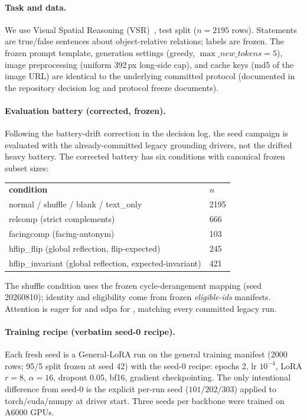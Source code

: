\paragraph{Task and data.}
We use Visual Spatial Reasoning (VSR)~\cite{liu2023vsr}, test split
($n=2195$ rows). Statements are true/false sentences about object-relative
relations; labels are frozen. The frozen prompt template, generation
settings (greedy, $\max\_new\_tokens=5$), image preprocessing (uniform
392\,px long-side cap), and cache keys (md5 of the image URL) are identical
to the underlying committed protocol (documented in the repository decision
log and protocol freeze documents).

\paragraph{Evaluation battery (corrected, frozen).}
Following the battery-drift correction in the decision log, the seed
campaign is evaluated with the already-committed legacy grounding drivers,
not the drifted heavy battery. The corrected battery has six conditions
with canonical frozen subset sizes:
\begin{center}
\begin{tabular}{ll}
\textbf{condition} & \textbf{$n$} \\
normal / shuffle / blank / text\_only & 2195 \\
relcomp (strict complements) & 666 \\
facingcomp (facing-antonym) & 103 \\
hflip\_flip (global reflection, flip-expected) & 245 \\
hflip\_invariant (global reflection, expected-invariant) & 421 \\
\end{tabular}
\end{center}
The shuffle condition uses the frozen cycle-derangement mapping
(seed 20260810); identity and eligibility come from frozen
\emph{eligible-ids} manifests. Attention is eager for \qwen{} and sdpa for
\smol{}, matching every committed legacy run.

\paragraph{Training recipe (verbatim seed-0 recipe).}
Each fresh seed is a General-LoRA run on the general training manifest
(2000 rows; 95/5 split frozen at seed 42) with the seed-0 recipe:
epochs 2, lr $10^{-4}$, LoRA $r{=}8$, $\alpha{=}16$, dropout 0.05, bf16,
gradient checkpointing. The only intentional difference from seed-0 is the
explicit per-run seed ($101/202/303$) applied to torch/cuda/numpy at
driver start. Three seeds per backbone were trained on A6000 GPUs.

